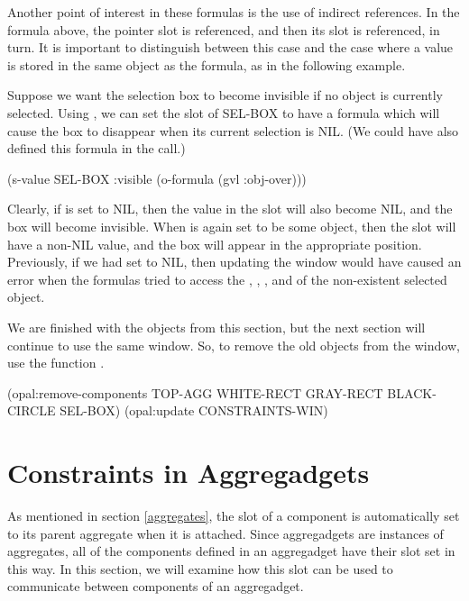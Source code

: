 Another point of interest in these formulas is the use of indirect
references.  In the  formula above, the pointer slot 
is referenced, and then its  slot is referenced, in turn.
It is important to distinguish between this case and the case where
a value is stored in the same object as the formula, as in the
following example.

Suppose we want the selection box to become invisible if no object is
currently selected.  Using , we can set the 
slot of SEL-BOX to have a formula which will cause the box to
disappear when its current selection is NIL.  (We could have also
defined this formula in the  call.)

\begin{programexample}
(s-value SEL-BOX :visible (o-formula (gvl :obj-over)))
\end{programexample}

Clearly, if  is set to NIL, then the value in the
 slot will also become NIL, and the box will become
invisible.  When  is again set to be some object, then
the  slot will have a non-NIL value, and the box will
appear in the appropriate position.  Previously, if we had set
 to NIL, then updating the window would have caused an
error when the formulas tried to access the , ,
, and  of the non-existent selected object.

We are finished with the objects from this section, but the next
section will continue to use the same window.  So, to remove the old
objects from the window, use the function .

\begin{programexample}
(opal:remove-components TOP-AGG WHITE-RECT GRAY-RECT BLACK-CIRCLE SEL-BOX)
(opal:update CONSTRAINTS-WIN)
\end{programexample}


\section{Constraints in Aggregadgets}
\label{aggregadget-ex}

As mentioned in section \ref{aggregates}, the  slot of a
component is automatically set to its parent aggregate when it is
attached.  Since aggregadgets are instances of aggregates, all of the
components defined in an aggregadget have their  slot set
in this way.  In this section, we will examine how this slot can be
used to communicate between components of an aggregadget.

